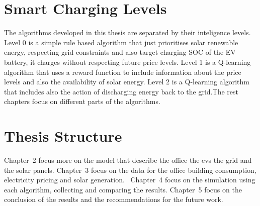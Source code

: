 \section{Smart Charging Levels}
\label{sec:smart_charging_levels}

The algorithms developed in this thesis are separated by their inteligence levels. Level 0 is a simple rule based algorithm that just prioritises solar renewable energy, respecting grid constraints and also target charging SOC of the EV battery, it charges without respecting future price levels. 
Level 1 is a Q-learning algorithm that uses a reward function to include information about the price levels and also the availability of solar energy. Level 2 is a Q-learning algorithm that includes also the action of discharging energy back to the grid.The rest chapters focus on different parts of the algorithms.

\section{Thesis Structure}
\label{sec:structure}

Chapter~2 focus more on the model that describe the office the evs the grid and the solar panels. Chapter~3 focus on the data for the office building consumption, electricity pricing and solar generation.  Chapter~4 focus on the simulation using each algorithm, collecting and comparing the results.
Chapter~5 focus on the conclusion of the results and the recommendations for the future work.